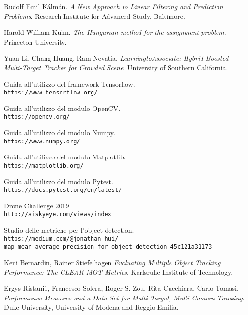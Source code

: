 \begin{thebibliography}{99}
Rudolf Emil Kálmán.
\textit{A New Approach to Linear Filtering
and Prediction Problems}. Research Institute for Advanced Study, Baltimore.

Harold William Kuhn.
\textit{The Hungarian method for the assignment problem}. Princeton University.

Yuan Li, Chang Huang, Ram Nevatia.
\textit{LearningtoAssociate: Hybrid Boosted Multi-Target Tracker for Crowded Scene}. University of Southern California.

Guida all'utilizzo del framework Tensorflow.
\\\texttt{https://www.tensorflow.org/}

Guida all'utilizzo del modulo OpenCV.
\\\texttt{https://opencv.org/}

Guida all'utilizzo del modulo Numpy.
\\\texttt{https://www.numpy.org/}

Guida all'utilizzo del modulo Matplotlib.
\\\texttt{https://matplotlib.org/}

Guida all'utilizzo del modulo Pytest.
\\\texttt{https://docs.pytest.org/en/latest/}

Drone Challenge 2019
\\\texttt{http://aiskyeye.com/views/index}

Studio delle metriche per l'object detection.
\\\texttt{https://medium.com/@jonathan\_hui/\\
map-mean-average-precision-for-object-detection-45c121a31173}

Keni Bernardin, Rainer Stiefelhagen
\textit{Evaluating Multiple Object Tracking Performance: The CLEAR MOT Metrics}. Karlsruhe Institute of Technology.

Ergys Ristani1, Francesco Solera, Roger S. Zou, Rita Cucchiara, Carlo Tomasi.
\textit{Performance Measures and a Data Set for Multi-Target, Multi-Camera Tracking}. Duke University, University of Modena and Reggio Emilia.

\end{thebibliography}